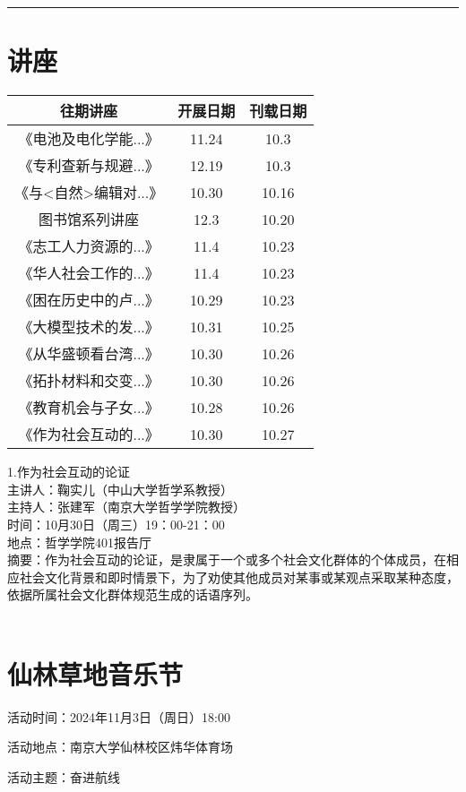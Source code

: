 \documentclass[letterpaper, 12pt]{article}
\begin{document}
\hrule
\pagebreak
\begin{multicols}{2}

\section{讲座}
\begin{tabular}{|c|c|c|}
    \hline
    往期讲座 & 开展日期 & 刊载日期\\
    \hline\hline
    《电池及电化学能...》 & 11.24 & 10.3\\
    《专利查新与规避...》 & 12.19 & 10.3\\
    《与<自然>编辑对...》 & 10.30 & 10.16\\
    图书馆系列讲座 & 12.3 & 10.20\\
    《志工人力资源的...》 & 11.4 & 10.23\\
    《华人社会工作的...》 & 11.4 & 10.23\\
    《困在历史中的卢...》 & 10.29 & 10.23\\
    《大模型技术的发...》 & 10.31 & 10.25\\
    《从华盛顿看台湾...》 & 10.30 & 10.26\\
    《拓扑材料和交变...》 & 10.30 & 10.26\\
    《教育机会与子女...》 & 10.28 & 10.26\\
    《作为社会互动的...》 & 10.30 & 10.27\\
    \hline
\end{tabular}

1.作为社会互动的论证\\
主讲人：鞠实儿（中山大学哲学系教授）\\
主持人：张建军（南京大学哲学学院教授）\\
时间：10月30日（周三）19：00-21：00\\
地点：哲学学院401报告厅\\
摘要：作为社会互动的论证，是隶属于一个或多个社会文化群体的个体成员，在相应社会文化背景和即时情景下，为了劝使其他成员对某事或某观点采取某种态度，依据所属社会文化群体规范生成的话语序列。\\\\

\section{仙林草地音乐节}
活动时间：2024年11月3日（周日）18:00

活动地点：南京大学仙林校区炜华体育场

活动主题：奋进航线


\end{multicols}
\end{document}
